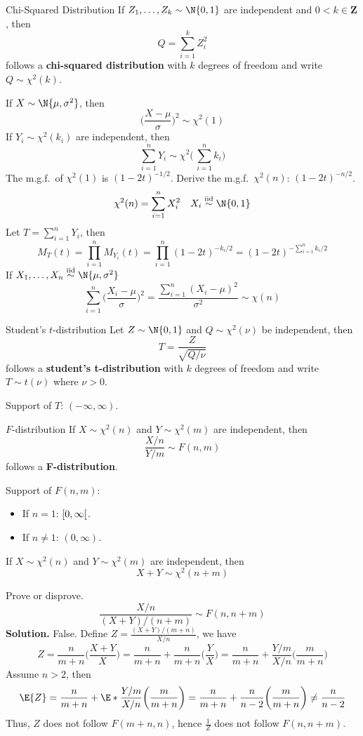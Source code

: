 \begin{Definition}{Chi-Squared Distribution}{}
    If $ Z_1,\ldots,Z_k \sim \N{0,1} $ are independent
    and $ 0<k\in\mathbf{Z} $, then
    \[ Q=\sum_{i=1}^{k} Z_i^2 \]
    follows a \textbf{chi-squared distribution}
    with $ k $ degrees of freedom and write
    $ Q \sim \chi^2(k) $.
\end{Definition}
If $ X \sim \N{\mu,\sigma^2} $, then
\[ \biggl(\frac{X-\mu}{\sigma}\biggr)^{\!2} \sim \chi^2(1)  \]
If $ Y_i \sim \chi^2(k_i) $ are independent, then
\[ \sum_{i=1}^{n} Y_i \sim \chi^2\biggl(\,\sum_{i=1}^{n} k_i\biggr) \]
The m.g.f.\ of $ \chi^2(1) $ is $ (1-2t)^{-1/2} $. Derive
the m.g.f.\ $ \chi^2(n) $: $ (1-2t)^{-n/2} $.
\[ \chi^2(n)=\sum_{i=1}^{n} X_i^2\quad X_i\stackrel{\text{iid}}{\sim}\N{0,1}\]
Let $ T=\sum_{i=1}^{n} Y_i $, then
\[
    M_T(t)
    =\prod_{i=1}^n M_{Y_i}(t)
    =\prod_{i=1}^n(1-2t)^{-k_i/2}
    =(1-2t)^{-\sum_{i=1}^{n} k_i/2}
\]
If $ X_1,\ldots,X_n\stackrel{\text{iid}}{\sim}\N{\mu,\sigma^2} $
\[ \sum_{i=1}^{n} \biggl(\frac{X_i-\mu}{\sigma}\biggr)^{\!2}=
    \frac{\sum_{i=1}^{n} (X_i-\mu)^2}{\sigma^2}\sim \chi(n)  \]
\begin{Definition}{Student's $ t $-distribution}{}
    Let $ Z \sim \N{0,1} $ and $ Q \sim \chi^2(\nu) $
    be independent, then
    \[ T=\frac{Z}{\sqrt{Q/\nu}}  \]
    follows a \textbf{student's t-distribution}
    with $ k $ degrees of freedom and write
    $ T \sim t(\nu) $ where $ \nu>0 $.

    Support of $ T $: $ (-\infty,\infty) $.
\end{Definition}
\begin{Definition}{$ F $-distribution}{}
    If $ X \sim \chi^2(n) $ and $ Y \sim \chi^2(m) $
    are independent, then
    \[ \frac{X/n}{Y/m} \sim F(n,m) \]
    follows a \textbf{F-distribution}.

    Support of $ F(n,m) $:
    \begin{itemize}
        \item If $ n=1 $: $ \interval[open right]{0}{\infty} $.
        \item If $ n\neq 1 $: $ (0,\infty) $.
    \end{itemize}
\end{Definition}
If $ X \sim \chi^2(n) $ and $ Y \sim \chi^2(m) $ are independent,
then
\[ X+Y \sim \chi^2(n+m) \]
\begin{Exercise}{}{}
    Prove or disprove.
    \[ \frac{X/n}{(X+Y)/(n+m)} \sim F(n,n+m) \]
    \textbf{Solution.} False. Define
    $ \displaystyle Z=\frac{(X+Y)/(m+n)}{X/n} $, we have
    \[ Z=\frac{n}{m+n} \biggl(\frac{X+Y}{X} \biggr)=
        \frac{n}{m+n} +\frac{n}{m+n}\biggl(\frac{Y}{X} \biggr)
        =\frac{n}{m+n} +\frac{Y/m}{X/n} \biggl(\frac{m}{m+n} \biggr) \]
    Assume $ n>2 $, then
    \[ \E{Z}=\frac{n}{m+n} +\E*{\frac{Y/m}{X/n}}\biggl(\frac{m}{m+n} \biggr)
        =\frac{n}{m+n}+\frac{n}{n-2} \bigg(\frac{m}{m+n} \biggr)\ne \frac{n}{n-2}  \]
    Thus, $ Z $ does not follow $ F(m+n,n) $, hence
    $ \displaystyle \frac{1}{Z} $ does not follow $ F(n,n+m) $.
\end{Exercise}
